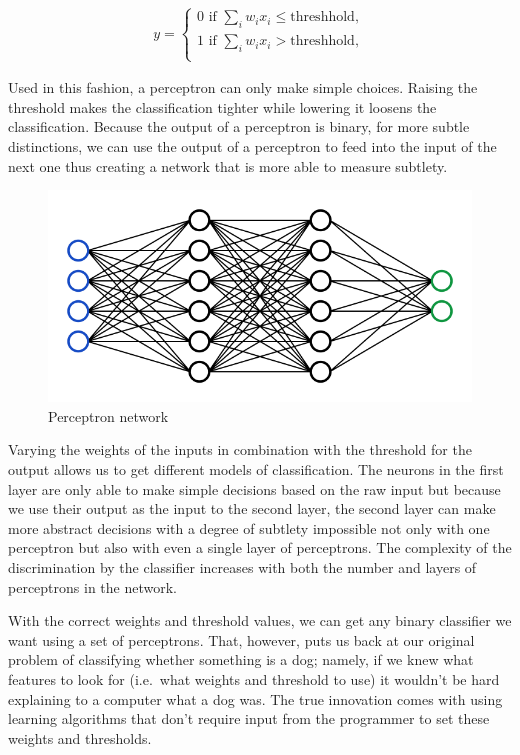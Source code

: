 \begin{align}
  y = \begin{cases}
    0 \textrm{ if } \sum_i w_i x_i \leq \textrm{threshhold},\\
    1 \textrm{ if } \sum_i w_i x_i > \textrm{threshhold},\\
  \end{cases}
\end{align}

Used in this fashion, a perceptron can only make simple choices.
Raising the threshold makes the classification tighter while lowering it loosens the classification.
Because the output of a perceptron is binary, for more subtle distinctions, we can use the output of a perceptron to feed into the input of the next one thus creating a network that is more able to measure subtlety.

\begin{figure}[H]
  \centering
  \includegraphics[width=120mm]{figures/network.png}
  \caption{Perceptron network \cite{Zhou_2020}}
  \label{network}
\end{figure}

Varying the weights of the inputs in combination with the threshold for the output allows us to get different models of classification.
The neurons in the first layer are only able to make simple decisions based on the raw input but because we use their output as the input to the second layer, the second layer can make more abstract decisions with a degree of subtlety impossible not only with one perceptron but also with even a single layer of perceptrons.
The complexity of the discrimination by the classifier increases with both the number and layers of perceptrons in the network.

With the correct weights and threshold values, we can get any binary classifier we want using a set of perceptrons.
That, however, puts us back at our original problem of classifying whether something is a dog; namely, if we knew what features to look for (i.e.\ what weights and threshold to use) it wouldn't be hard explaining to a computer what a dog was.
The true innovation comes with using learning algorithms that don't require input from the programmer to set these weights and thresholds.

